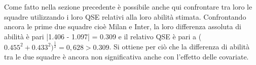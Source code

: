 Come fatto nella sezione precedente è possibile anche qui confrontare tra loro le squadre utilizzando i loro QSE relativi alla loro abilità stimata.
Confrontando ancora le prime due squadre cioè Milan e Inter, la loro differenza assoluta di abilità è pari |1.406 - 1.097| = 0.309 e il relativo QSE è pari a ($0.455^2 + 0.433^2)^\frac{1}{2}=0,628 > 0.309$. Si ottiene per ciò che la differenza di abilità tra le due squadre è ancora non significativa anche con l’effetto delle covariate.
\begin{comment}
\begin{table}[!htb]%
	
	\renewcommand{\arraystretch}{1.7}
	\centering
	\begin{tabular}{c c c c c c}
		\hline	
		
		\textbf{Squadra} & \textbf{Abilità} & \textbf{SE} & \textbf{QSE} & \textbf{QV} & \textbf{Rank}   \\	
		\hline			
		Milan & 1.406 & 0.644 & 0.455 & 0.239 & 1\\
		Inter & 1.097 & 0.685 & 0.433 & 0.286 & 2\\
		Napoli & 1.067 & 0.595 & 0.423 & 0.236 & 3 \\		
		Juventus & 0.892 & 0.623 & 0.417& 0.226& 4\\
		Lazio & 0.399 & 0.645 & 0.467 & 0.276 & 5\\
		Roma & 0.377 & 0.634 & 0.469 & 0.279 & 6\\
		*Atalanta & 0.317 & 0.000 & 0.423& 0.238& 8 \\
		*Fiorentina & 0.236 & 0.596 & 0.383 & 0.235& 7\\
		*Torino & 0.092 & 0.591 & 0.427 & 0.165 & 10 \\
		*Hellas Verona & 0.013 & 0.561 & 0.427& 0.164& 9\\
		Sassuolo & -0.023 & 0.587 & 0.435 & 0.253& 11\\
		*Bologna & -0.045 & 0.657& 0.459& 0.128& 13\\
		*Empoli & -0.094 & 0.618& 0.432& 0.211 & 14\\
		*Udinese & -0.178 & 0.642& 0.478 & 0.281& 12\\
		Sampdoria & -0.426 & 0.600 & 0.453& 0.288& 15\\
		*Salernitana & -0.854 & 0.544& 0.429& 0.219& 17\\
		*Spezia & -0.922 & 0.587& 0.452 & 0.249 & 16\\
		Cagliari & -1.01 & 0.612 & 0.498& 0.269 & 18\\
		Genoa & -1.026 & 0.632 & 0.456 & 0.214& 19 \\
		Venezia & -1.318 & 0.592 & 0.434 & 0.231 & 20\\
		
		\hline
		& & & & & \\
		
	\end{tabular} \hbox{}
	\caption{Stime delle abilità con relativi \emph{Standard 
			Error} (SE), \emph{Quasi Standard Error} (QSE) e \emph{Quasi Variance} (QV). Nella tabella viene indicato con un asterisco le squadre con un piazzamento stimato diverso da quello reale.} \label{tab:BTC}  
\end{table}
\end{comment}
